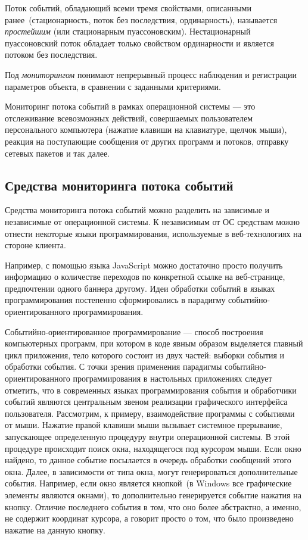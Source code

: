 Поток событий, обладающий всеми тремя свойствами, описанными
ранее~(стационарность, поток без последствия, ординарность), называется
\textit{простейшим} (или стационарным пуассоновским).
Нестационарный пуассоновский поток обладает только свойством ординарности и
является потоком без последствия.

Под \textit{мониторингом} понимают непрерывный процесс наблюдения и регистрации
параметров объекта, в сравнении с заданными критериями.

Мониторинг потока событий в рамках операционной системы --- это
отслеживание всевозможных действий, совершаемых пользователем персонального
компьютера (нажатие клавиши на клавиатуре, щелчок мыши), реакция на
поступающие сообщения от других программ и потоков, отправку
сетевых пакетов и так далее.

\subsection{Средства мониторинга потока событий}
\label{sub:monitoring_tools}

Средства мониторинга потока событий можно разделить на зависимые и независимые
от операционной системы. К независимым от ОС средствам можно отнести некоторые
языки программирования, используемые в веб-технологиях на стороне клиента.

Например, с помощью языка JavaScript можно достаточно просто получить информацию
о количестве переходов по конкретной ссылке на веб-странице, предпочтении одного
баннера другому. Идеи обработки событий в языках программирования постепенно
сформировались в парадигму событийно-ориентированного программирования.

Событийно-ориентированное программирование --- способ построения компьютерных
программ, при котором в коде явным образом выделяется главный цикл приложения,
тело которого состоит из двух частей: выборки события и обработки события.
С точки зрения применения парадигмы событийно-ориентированного программирования
в настольных приложениях следует отметить, что в современных языках программирования
события и обработчики событий являются центральным звеном реализации
графического интерфейса пользователя. Рассмотрим, к примеру,
взаимодействие программы с событиями от мыши. Нажатие правой клавиши мыши
вызывает системное прерывание, запускающее определенную процедуру внутри
операционной системы. В этой процедуре происходит поиск окна,
находящегося под курсором мыши. Если окно найдено, то данное событие посылается
в очередь обработки сообщений этого окна. Далее, в зависимости от типа окна,
могут генерироваться дополнительные события. Например, если окно является
кнопкой~(в Windows все графические элементы являются окнами), то дополнительно
генерируется событие нажатия на кнопку. Отличие последнего события в том,
что оно более абстрактно, а именно, не содержит координат курсора, а говорит
просто о том, что было произведено нажатие на данную кнопку.

